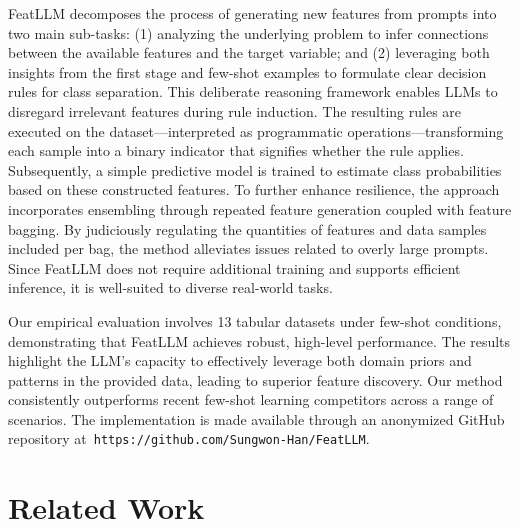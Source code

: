 \textsf{FeatLLM} decomposes the process of generating new features from prompts into two main sub-tasks: (1) analyzing the underlying problem to infer connections between the available features and the target variable; and (2) leveraging both insights from the first stage and few-shot examples to formulate clear decision rules for class separation. This deliberate reasoning framework enables LLMs to disregard irrelevant features during rule induction. The resulting rules are executed on the dataset—interpreted as programmatic operations—transforming each sample into a binary indicator that signifies whether the rule applies. Subsequently, a simple predictive model is trained to estimate class probabilities based on these constructed features. To further enhance resilience, the approach incorporates ensembling through repeated feature generation coupled with feature bagging. By judiciously regulating the quantities of features and data samples included per bag, the method alleviates issues related to overly large prompts. Since \textsf{FeatLLM} does not require additional training and supports efficient inference, it is well-suited to diverse real-world tasks.

Our empirical evaluation involves 13 tabular datasets under few-shot conditions, demonstrating that \textsf{FeatLLM} achieves robust, high-level performance. The results highlight the LLM’s capacity to effectively leverage both domain priors and patterns in the provided data, leading to superior feature discovery. Our method consistently outperforms recent few-shot learning competitors across a range of scenarios. The implementation is made available through an anonymized GitHub repository at~\texttt{https://github.com/Sungwon-Han/FeatLLM}.

\section{Related Work}

